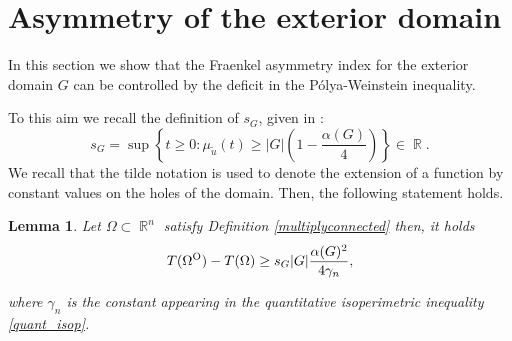 \documentclass[oneside,a4paper,11pt,notitlepage]{article}
\newcommand{\abs}[1]{{\left|#1\right|}}
\theoremstyle{definition}
\theoremstyle{plain}
\newtheorem{lemma}[theorem]{Lemma}
\theoremstyle{definition}
\DeclareMathOperator{\R}{\mathbb{R}}
\newcommand{\OO}{\text{\normalfont  O}}
\begin{document}
\section{Asymmetry of the exterior domain}\label{section4}

In this section we show that the Fraenkel asymmetry index for the exterior domain $G$ can be controlled by the deficit in the P\'olya-Weinstein inequality. 

 To this aim we recall the definition of $s_G$, given in \cite{BD}:
    \begin{equation*}
        s_{G}=\sup\left\{ t\geq 0: \mu_{\tilde u}(t)\geq \abs{G}\left(1-\dfrac{\alpha(G)}{4}\right)\right\} \in \R.
    \end{equation*}
We recall that the tilde notation is used to denote the extension of a function by constant values on the holes of the domain.
Then, the following statement holds.
\begin{lemma}\label{4.1}
Let $\Omega\subset\R^n$ satisfy Definition \ref{multiplyconnected} then, it holds
    \begin{equation}
        \label{essamitorsion}
         T(\Omega^\OO)- T(\Omega)\geq s_G\abs{G}\frac{\alpha(G)^2}{4\gamma_n},
    \end{equation}

    where $\gamma_n$ is the constant appearing in the quantitative isoperimetric inequality \eqref{quant_isop}.
\end{lemma}
\end{document}
